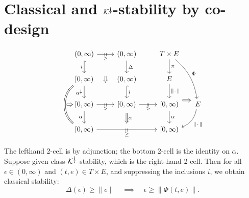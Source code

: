 \documentclass[11pt, one side, article]{memoir}
\theoremstyle{definition}
\theoremstyle{plain}
\newcommand{\cat}[1]{\mathcal{#1}}%
\newcommand{\ldag}{^{\rotatebox{180}{$\dagger$}}}
\newcommand{\blank}[1][1pt]{\hspace{#1}\cdot\hspace{#1}}
\newcommand{\K}{\cat{K}}
\newcommand{\Kdag}[1][0]{\K\ldag}
\newcommand{\ttick}{\shortmid\shortmid}
\begin{document}
\chapter{Classical and $\Kdag$-stability by co-design}
\label{}

\[
\begin{tikzcd}
	{(0,\infty)}
		\ar[d, hook, "i"']\ar[r, "\ttick"{marking, name=A1}, "\geq" below=1pt]
	&
	{(0,\infty)}
		\ar[d, "\Delta"]
	&
	T\times E
		\ar[d, "\pi"]\ar[ddr, bend left=20pt, "\Phi"]
	\\
	{[0,\infty)}
		\ar[dd, shift right=5pt, bend right=50pt, equal, "" name=C1]\ar[d, "\alpha\ldag"']
	&
	{(0,\infty)}
		\ar[d, hook, "i"]
	&
	E
		\ar[d, "\|\blank\|"]
	\\
	|[alias=C2]|{[0,\infty)}
		\ar[r, "\ttick"{marking, name=A2}, "\geq" below=1pt]
		\ar[d, "\alpha"']
	&
	|[alias=B1]|{[0,\infty)}
		\ar[r, "\ttick"{marking}, "\geq" below=1pt]
	&
	{[0,\infty)}
		\ar[d, "\alpha"]\ar[r, Rightarrow, yshift=6pt, shorten=1pt]
	&[-10pt]
	E
		\ar[dl, bend left, "\|\blank\|"]
	\\
	{[0,\infty)}\ar[rr, "\ttick"{marking, name=B2}, "\geq" below=1pt]
	&&
	{[0,\infty)}
		\ar[from=A1, to=A2, Rightarrow, shorten=25pt]
		\ar[from=B1, to=B2, Rightarrow, shorten=3pt, "\alpha"]
		\ar[from=C1, to=C2, Rightarrow, shorten=-2pt]
\end{tikzcd}
\]

The lefthand 2-cell is by adjunction; the bottom 2-cell is the identity on $\alpha$. Suppose given class-$\Kdag$-stability, which is the right-hand 2-cell. Then for all $\epsilon\in(0,\infty)$ and $(t,e)\in T\times E$, and suppressing the inclusions $i$, we obtain classical stability:
\[
  \Delta(\epsilon)\geq \|e\|
  \quad\implies\quad
	\epsilon\geq\|\Phi(t,e)\|.
\]
\end{document}
